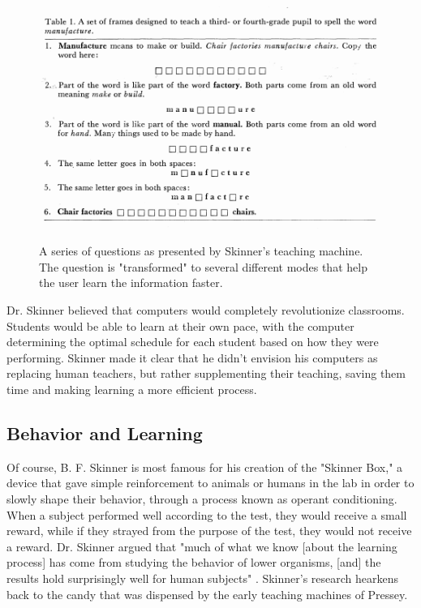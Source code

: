  \begin{figure}[h!]
 	\includegraphics[width=1.0\linewidth]{figures/skinner_machine}
 	\caption{A series of questions as presented by Skinner's teaching machine. The question is "transformed" to several different modes that help the user learn the information faster. }
 	\label{fig:skinner_machine}
 	\cite{benjamin1988history}
 \end{figure}
 

\par Dr. Skinner believed that computers would completely revolutionize classrooms. Students would be able to learn at their own pace, with the computer determining the optimal schedule for each student based on how they were performing. Skinner made it clear that he didn't envision his computers as replacing human teachers, but rather supplementing their teaching, saving them time and making learning a more efficient process.

\subsection{Behavior and Learning}

Of course, B. F. Skinner is most famous for his creation of the "Skinner Box," \cite{skinner1963operant} a device that gave simple reinforcement to animals or humans in the lab in order to slowly shape their behavior, through a process known as operant conditioning. When a subject performed well according to the test, they would receive a small reward, while if they strayed from the purpose of the test, they would not receive a reward. Dr. Skinner argued that "much of what we know [about the learning process] has come from studying the behavior of lower organisms, [and] the results hold surprisingly well for human subjects" \cite{skinner1958teaching}. Skinner's research hearkens back to the candy that was dispensed by the early teaching machines of Pressey.

